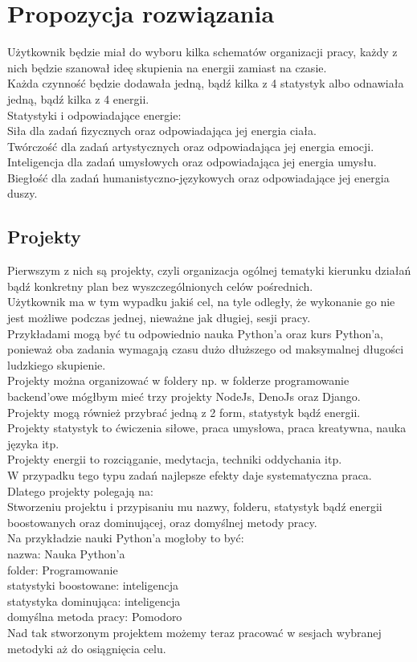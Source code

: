 \documentclass[a4paper,11pt]{report}
\begin{document}
\section {Propozycja rozwiązania}
Użytkownik będzie miał do wyboru kilka schematów organizacji pracy, każdy z nich będzie szanował ideę skupienia na energii zamiast na czasie.
\\Każda czynność będzie dodawała jedną, bądź kilka z 4 statystyk albo odnawiała jedną, bądź kilka z 4 energii.
\\Statystyki i odpowiadające energie:
\\Siła dla zadań fizycznych oraz odpowiadająca jej energia ciała.
\\Twórczość dla zadań artystycznych oraz odpowiadająca jej energia emocji.
\\Inteligencja dla zadań umysłowych oraz odpowiadająca jej energia umysłu.
\\Biegłość dla zadań humanistyczno-językowych oraz odpowiadające jej energia duszy.
\subsection{Projekty}
Pierwszym z nich są projekty, czyli organizacja ogólnej tematyki kierunku działań bądź konkretny plan bez wyszczególnionych celów pośrednich.
\\Użytkownik ma w tym wypadku jakiś cel, na tyle odległy, że wykonanie go nie jest możliwe podczas jednej, nieważne jak długiej, sesji pracy.
\\Przykładami mogą być tu odpowiednio nauka Python'a oraz kurs Python'a, ponieważ oba zadania wymagają czasu dużo dłuższego od maksymalnej długości ludzkiego skupienie.
\\Projekty można organizować w foldery np. w folderze programowanie backend'owe mógłbym mieć trzy projekty NodeJs, DenoJs oraz Django.
\\Projekty mogą również przybrać jedną z 2 form, statystyk bądź energii.
\\Projekty statystyk to  ćwiczenia siłowe, praca umysłowa, praca kreatywna, nauka języka itp.
\\Projekty energii to rozciąganie, medytacja, techniki oddychania itp.
\vspace{0.5cm}
\\W przypadku tego typu zadań najlepsze efekty daje systematyczna praca. Dlatego projekty polegają na:
\\Stworzeniu projektu i przypisaniu mu nazwy, folderu, statystyk bądź energii boostowanych oraz dominującej, oraz domyślnej metody pracy.
\\Na przykładzie nauki Python'a mogłoby to być:
\\nazwa: Nauka Python'a
\\folder: Programowanie
\\statystyki boostowane: inteligencja
\\statystyka dominująca: inteligencja
\\domyślna metoda pracy: Pomodoro
\\Nad tak stworzonym projektem możemy teraz pracować w sesjach wybranej metodyki aż do osiągnięcia celu.
\end{document}

